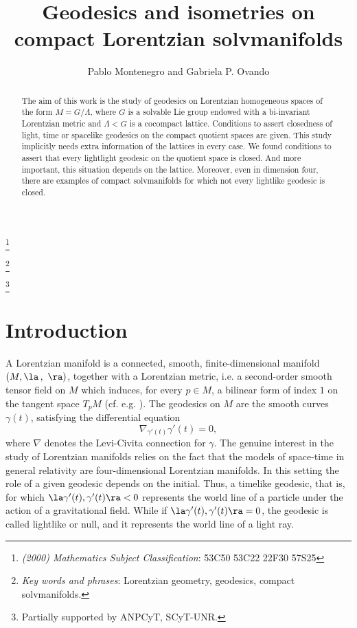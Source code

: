 \documentclass[12pt]{amsart}
\theoremstyle{plain}
\theoremstyle{definition}
\theoremstyle{remark}
\begin{document}
\title[Geodesics and isometries on compact Lorentzian solvmanifolds]{Geodesics and isometries on compact Lorentzian solvmanifolds}

\begin{abstract}
The aim of this work is the study of geodesics on Lorentzian homogeneous spaces of the form $M=G/\Lambda$, where $G$ is a solvable Lie group endowed with a bi-invariant Lorentzian metric and $\Lambda < G$ is a cocompact lattice. Conditions to assert closedness of light, time or spacelike geodesics on the compact quotient spaces are given. This study implicitly needs extra information of the lattices in every case. We found conditions to assert that every lightlight geodesic on the quotient space is closed. And more important, this situation depends on the lattice. Moreover, even in dimension four, there are examples of compact solvmanifolds for which not every lightlike geodesic is closed.
\end{abstract}

\author{Pablo Montenegro and Gabriela P. Ovando}

\let\today\relax 
\thanks{{\it (2000) Mathematics Subject Classification}: 53C50
	53C22
	22F30
	57S25}

\thanks{{\it Key words and phrases}: Lorentzian geometry, geodesics, compact solvmanifolds.}

\thanks{Partially supported by ANPCyT, SCyT-UNR.}

\address{Departamento de Matemática, ECEN - FCEIA, Universidad Nacional de Rosario, Pellegrini 250, 2000 Rosario, Santa Fe, Argentina.}


\maketitle

	
	
	\section{Introduction}
A Lorentzian manifold is a  connected, smooth, finite-dimensional manifold \\ $(M, \la \, , \ \ra)$, together with a Lorentzian metric, i.e. a second-order smooth
tensor field on $M$ which induces, for every $p\in M$, a bilinear form of index $1$ on the tangent
space $T_pM$ (cf. e.g. \cite{ON}). The geodesics on $M$ are the smooth curves $\gamma(t)$, satisfying the
differential equation
$$\nabla_{\gamma'(t)}\gamma'(t)=0,$$
where $\nabla$ denotes the Levi-Civita connection for $\gamma$. 	
	The genuine interest in the study of Lorentzian manifolds relies on the fact that the models of 	space-time in general relativity are four-dimensional Lorentzian manifolds. In this setting the role of a given geodesic depends on the initial. Thus, 	
a timelike geodesic, that is, for which  $\la \gamma'(t), \gamma'(t)\ra < 0$   represents the world line of a particle
	under the action of a gravitational field. While if $\la \gamma'(t), \gamma'(t)\ra = 0$, the geodesic is called lightlike or
	null, and it represents the world line of a light ray.
	
\end{document}
